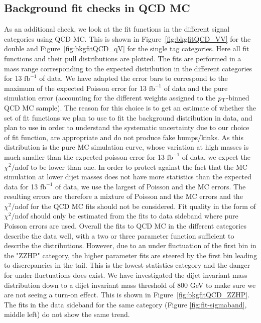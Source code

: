 \subsection{Background fit checks in QCD MC}
\label{sec:app:2016:mcfit}
As an additional check, we look at the fit functions in the different signal categories using QCD MC. This is shown in Figure~\ref{fig:bkgfitQCD_VV} for the double and Figure~\ref{fig:bkgfitQCD_qV} for the single tag categories. Here all fit functions and their pull distributions are plotted. The fits are performed in a mass range corresponding to the expected distribution in the different categories for 13 $\textrm{fb}^{-1}$ of data. We have adapted the error bars to correspond to the maximum of the expected Poisson error for 13 $\textrm{fb}^{-1}$ of data and the pure simulation error (accounting for the different weights assigned to the $p_{\mathrm{T}}$-binned QCD MC sample). The reason for this choice is to get an estimate of whether the set of fit functions we plan to use to fit the background distribution in data, and plan to use in order to understand the systematic uncertainty due to our choice of fit function, are appropriate and do not produce fake bumps/kinks. As this distribution is the pure MC simulation curve, whose variation at high masses is much smaller than the expected poisson error for 13 $\textrm{fb}^{-1}$ of data, we expect the $\chi^{2}/\textrm{ndof}$ to be lower than one. In order to protect against the fact that the MC simulation at lower dijet masses does not have more statistics than the expected data for 13 $\textrm{fb}^{-1}$ of data, we use the largest of Poisson and the MC errors. The resulting errors are therefore a mixture of Poisson and the MC errors and the $\chi^{2}/\textrm{ndof}$ for the QCD MC fits should not be considered. Fit quality in the form of $\chi^{2}/\textrm{ndof}$ should only be estimated from the fits to data sideband where pure Poisson errors are used. Overall the fits to QCD MC in the different categories describe the data well, with a two or three parameter function sufficient to describe the distributions. However, due to an under fluctuation of the first bin in the "ZZHP" category, the higher parameter fits are steered by the first bin leading to discrepancies in the tail. This is the lowest statistics category and the danger for under-fluctuations does exist. We have investigated the dijet invariant mass distribution down to a dijet invariant mass threshold of 800 GeV to make sure we are not seeing a turn-on effect. This is shown in Figure~\ref{fig:bkgfitQCD_ZZHP}. The fits in the data sideband for the same category (Figure \ref{fig:fit-sigmaband}, middle left) do not show the same trend.

